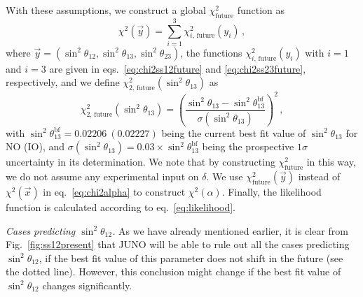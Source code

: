 \documentclass[11pt,a4paper]{article}
\newcommand{\be}{\begin{equation}}
\newcommand{\ee}{\end{equation}}
\def\th{\theta}
\numberwithin{equation}{section}
\begin{document}
 With these assumptions, we construct a global 
$\chi^2_\mathrm{future}$ function as
\be
\chi^2\left(\vec{y}\right) = \sum_{i=1}^3 \chi_{i,\,\mathrm{future}}^2\left(y_i\right)\,,
\ee
%
where $\vec{y} = (\sin^2\th_{12},\sin^2\th_{13},\sin^2\th_{23})$, 
the functions $\chi_{i,\,\mathrm{future}}^2(y_i)$ with $i=1$ and $i=3$ 
are given in eqs.~\eqref{eq:chi2ss12future} and \eqref{eq:chi2ss23future}, 
respectively, and we define $\chi_{2,\,\mathrm{future}}^2(\sin^2\th_{13})$ as
\be
\chi_\mathrm{2,\,future}^2\left(\sin^2\th_{13}\right) = \left(
\frac{\sin^2\th_{13} - \sin^2\th_{13}^\mathrm{bf}}{\sigma(\sin^2\th_{13})}
\right)^2\,,
\label{eq:chi2ss13future}
\ee
%
with $\sin^2\th_{13}^\mathrm{bf} = 0.02206~(0.02227)$ being the current 
best fit value of $\sin^2\th_{13}$ for NO (IO), 
and $\sigma(\sin^2\th_{13}) = 0.03\times\sin^2\th_{13}^\mathrm{bf}$ being 
the prospective $1\sigma$ uncertainty in its determination.
We note that by constructing $\chi^2_\mathrm{future}$ in this way, 
we do not assume any experimental input on $\delta$. 
We use $\chi^2_\mathrm{future}(\vec{y})$ instead of $\chi^2(\vec{x})$ 
in eq.~\eqref{eq:chi2alpha} to construct $\chi^2(\alpha)$. 
Finally, the likelihood function is calculated according 
to eq.~\eqref{eq:likelihood}.

 \textit{Cases predicting $\sin^2\th_{12}$.} 
As we have already mentioned earlier, it is clear from 
Fig.~\ref{fig:ss12present} that
JUNO will be able to rule out all the cases predicting $\sin^2\th_{12}$, 
if the best fit value of this parameter does not shift in 
the future (see the dotted line). 
However, this conclusion might change if the best fit value of $\sin^2\th_{12}$ 
changes significantly.
\end{document}
